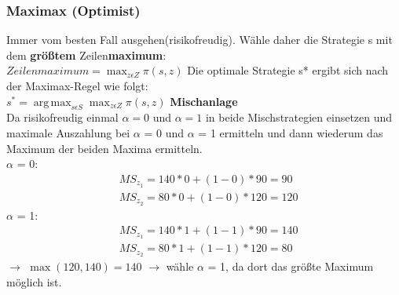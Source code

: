 \documentclass[11pt]{article}
\DeclareMathOperator*{\argmax}{arg\,max}
\begin{document}
\subsubsection{Maximax (Optimist)}
\label{sec:org583ca08}
Immer vom besten Fall ausgehen(risikofreudig). Wähle daher die Strategie s mit dem \textbf{größtem} Zeilen\textbf{maximum}:\\
\(\displaystyle Zeilenmaximum = \max_{z \epsilon Z} \pi(s,z)\)
\newline
Die optimale Strategie s* ergibt sich nach der Maximax-Regel wie folgt:\\
\(\displaystyle s^* = \argmax_{s \epsilon S} \max_{z \epsilon Z} \pi(s,z)\)
\newline
\textbf{Mischanlage}\\
Da risikofreudig einmal \(\alpha=0\) und \(\alpha=1\) in beide Mischstrategien einsetzen und maximale Auszahlung bei \(\alpha\) = 0 und \(\alpha\) = 1 ermitteln und dann wiederum das Maximum der beiden Maxima ermitteln.\\
\(\alpha\) = 0:\\
\begin{equation*}
\begin{aligned}
&MS_{z_1}=140*0 + (1-0)*90 = 90\\
&MS_{z_2}=80*0 + (1-0)*120 = 120
\end{aligned}
\end{equation*}
\newline
\(\alpha\) = 1:\\
\begin{equation*}
\begin{aligned}
&MS_{z_1}=140*1 + (1-1)*90 = 140\\
&MS_{z_2}=80*1 + (1-1)*120 = 80
\end{aligned}
\end{equation*}
\newline
\(\rightarrow\) \(\max(120,140)=140\) \(\rightarrow\) wähle \(\alpha\) = 1, da dort das größte Maximum möglich ist.
\newline\\
\end{document}

